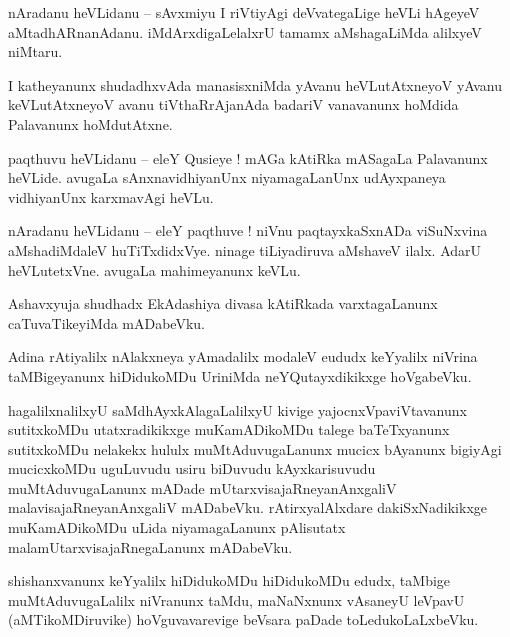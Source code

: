 \documentclass{article}
\begin{document}
\begin{mn}%
nAradanu heVLidanu -- sAvxmiyu I riVtiyAgi deVvategaLige heVLi hAgeyeV aMtadhARnanAdanu. 
iMdArxdigaLelalxrU tamamx aMshagaLiMda alilxyeV niMtaru.
\end{mn}

\begin{mn}%
I katheyanunx shudadhxvAda manasisxniMda yAvanu heVLutAtxneyoV yAvanu keVLutAtxneyoV avanu 
tiVthaRrAjanAda badariV vanavanunx hoMdida Palavanunx hoMdutAtxne.
\end{mn}


\begin{mn}%
paqthuvu heVLidanu -- eleY Qusieye ! mAGa kAtiRka mASagaLa Palavanunx heVLide. avugaLa 
sAnxnavidhiyanUnx niyamagaLanUnx udAyxpaneya vidhiyanUnx karxmavAgi heVLu.
\end{mn}

\begin{mn}%
nAradanu heVLidanu -- eleY paqthuve ! niVnu paqtayxkaSxnADa viSuNxvina aMshadiMdaleV huTiTxdidxVye. 
ninage tiLiyadiruva aMshaveV ilalx. AdarU heVLutetxVne. avugaLa mahimeyanunx keVLu.
\end{mn}

\begin{mn}%
Ashavxyuja shudhadx EkAdashiya divasa kAtiRkada varxtagaLanunx caTuvaTikeyiMda mADabeVku.
\end{mn}

\begin{mn}%
Adina rAtiyalilx nAlakxneya yAmadalilx modaleV eududx keYyalilx niVrina taMBigeyanunx hiDidukoMDu 
UriniMda neYQutayxdikikxge hoVgabeVku.
\end{mn}

\begin{mn}%
hagalilxnalilxyU saMdhAyxkAlagaLalilxyU kivige yajocnxVpaviVtavanunx sutitxkoMDu utatxradikikxge 
muKamADikoMDu talege baTeTxyanunx sutitxkoMDu nelakekx hululx muMtAduvugaLanunx mucicx bAyanunx 
bigiyAgi mucicxkoMDu uguLuvudu  usiru biDuvudu kAyxkarisuvudu muMtAduvugaLanunx mADade 
mUtarxvisajaRneyanAnxgaliV malavisajaRneyanAnxgaliV mADabeVku. rAtirxyalAlxdare dakiSxNadikikxge 
muKamADikoMDu uLida niyamagaLanunx pAlisutatx malamUtarxvisajaRnegaLanunx mADabeVku.
\end{mn}

\begin{mn}%
shishanxvanunx keYyalilx hiDidukoMDu hiDidukoMDu edudx, taMbige muMtAduvugaLalilx niVranunx taMdu, 
maNaNxnunx vAsaneyU leVpavU (aMTikoMDiruvike) hoVguvavarevige beVsara paDade toLedukoLaLxbeVku.
\end{mn}
\end{document}

